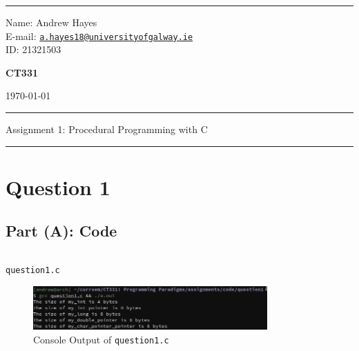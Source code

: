 \documentclass[a4paper]{article}
\newenvironment{code}{\captionsetup{type=listing, skip=0pt}}{}
\begin{document}
\hrule \medskip
\begin{minipage}{0.295\textwidth} 
    \raggedright
    \footnotesize 
    Name: Andrew Hayes \\
    E-mail: \href{mailto://a.hayes18@universityofgalway.ie}{\texttt{a.hayes18@universityofgalway.ie}}  \hfill\\   
    ID: 21321503 \hfill
\end{minipage}
\begin{minipage}{0.4\textwidth} 
    \centering 
    \vspace{0.4em}
    \Large 
    \textbf{CT331} \\ 
\end{minipage}
\begin{minipage}{0.295\textwidth} 
    \raggedleft
    \today
\end{minipage}
\medskip\hrule 
\begin{center}
    \normalsize
    Assignment 1: Procedural Programming with C
\end{center}
\hrule

\section{Question 1}
\subsection{Part (A): Code}

\begin{code}
\inputminted[texcl, mathescape, linenos, breaklines, frame=single]{C}{../code/question1/question1.c}
\caption{\texttt{question1.c}}
\end{code}

\begin{figure}[H]
    \centering
    \includegraphics[width=0.8\textwidth]{./images/question1.png}
    \caption{Console Output of \texttt{question1.c}}
\end{figure}
\end{document}
